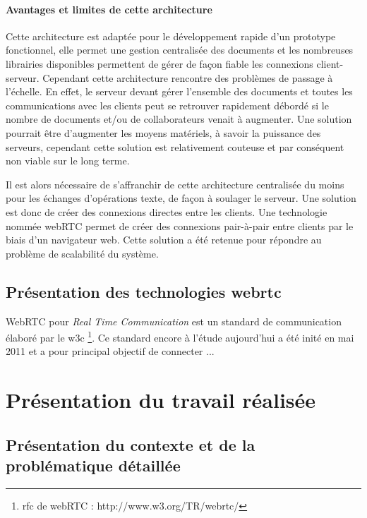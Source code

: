 \documentclass{tnreport}
\begin{document}
\subsubsection{Avantages et limites de cette architecture}

Cette architecture est adaptée pour le développement rapide d'un prototype fonctionnel, elle permet une gestion centralisée des documents et les nombreuses librairies disponibles permettent de gérer de façon fiable les connexions client-serveur. Cependant cette architecture rencontre des problèmes de passage à l'échelle. En effet, le serveur devant gérer l'ensemble des documents et toutes les communications avec les clients peut se retrouver rapidement débordé si le nombre de documents et/ou de collaborateurs venait à augmenter. Une solution pourrait être d'augmenter les moyens matériels, à savoir la puissance des serveurs, cependant cette solution est relativement couteuse et par conséquent non viable sur le long terme.

Il est alors nécessaire de s'affranchir de cette architecture centralisée du moins pour les échanges d'opérations texte, de façon à soulager le serveur. Une solution est donc de créer des connexions directes entre les clients. Une technologie nommée webRTC permet de créer des connexions pair-à-pair entre clients par le biais d'un navigateur web. Cette solution a été retenue pour répondre au problème de scalabilité du système.




\section{Présentation des technologies webrtc}
WebRTC pour \emph{Real Time Communication} est un standard de communication élaboré par le w3c \footnote{rfc de webRTC : http://www.w3.org/TR/webrtc/}. Ce standard encore à l'étude aujourd'hui a été inité en mai 2011 et a pour principal objectif de connecter ...

\cleardoublepage

\chapter{Présentation du travail réalisée}

\section{Présentation du contexte et de la problématique détaillée}
\end{document}
